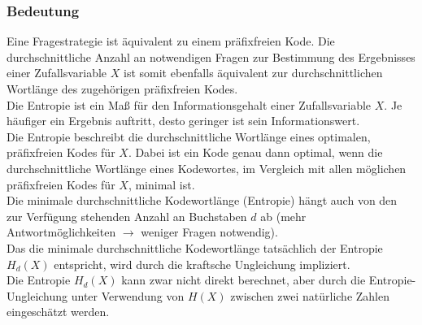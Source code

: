 \documentclass[a4paper]{article}
\begin{document}
\subsubsection{Bedeutung}
Eine Fragestrategie ist äquivalent zu einem präfixfreien Kode. Die durchschnittliche Anzahl an notwendigen Fragen zur Bestimmung des Ergebnisses einer Zufallsvariable $X$ ist somit ebenfalls äquivalent zur durchschnittlichen Wortlänge des zugehörigen präfixfreien Kodes.\\
Die Entropie ist ein Maß für den Informationsgehalt einer Zufallsvariable $X$. Je häufiger ein Ergebnis auftritt, desto geringer ist sein Informationswert.\\
Die Entropie beschreibt die durchschnittliche Wortlänge eines optimalen, präfixfreien Kodes für $X$. Dabei ist ein Kode genau dann optimal, wenn die durchschnittliche Wortlänge eines Kodewortes, im Vergleich mit allen möglichen präfixfreien Kodes für $X$, minimal ist.\\
Die minimale durchschnittliche Kodewortlänge (Entropie) hängt auch von den zur Verfügung stehenden Anzahl an Buchstaben $d$ ab (mehr Antwortmöglichkeiten $\rightarrow$ weniger Fragen notwendig).\\
Das die minimale durchschnittliche Kodewortlänge tatsächlich der Entropie $H_d(X)$ entspricht, wird durch die kraftsche Ungleichung impliziert.\\
Die Entropie $H_d(X)$ kann zwar nicht direkt berechnet, aber durch die Entropie-Ungleichung unter Verwendung von $H(X)$ zwischen zwei natürliche Zahlen eingeschätzt werden.
\end{document}
